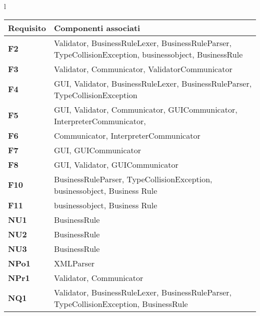 \begin{center}


\large{
\begin{tabular}{l}
\begin{tabular}{||p{3cm}||p{9cm}||} \hline
\textbf{Requisito} & {Componenti associati} \\ \hline
\textbf{F2} & Validator, BusinessRuleLexer, BusinessRuleParser, TypeCollisionException, businessobject, BusinessRule \\ \hline
\textbf{F3} & Validator, Communicator, ValidatorCommunicator \\ \hline
\textbf{F4} & GUI, Validator, BusinessRuleLexer, BusinessRuleParser, TypeCollisionException \\ \hline
\textbf{F5} & GUI, Validator, Communicator, GUICommunicator, InterpreterCommunicator, \\ \hline
\textbf{F6} & Communicator, InterpreterCommunicator \\ \hline
\textbf{F7} & GUI, GUICommunicator \\ \hline
\textbf{F8} & GUI, Validator, GUICommunicator \\ \hline
\textbf{F10} & BusinessRuleParser, TypeCollisionException, businessobject, Business Rule \\ \hline
\textbf{F11} & businessobject, Business Rule \\ \hline
\textbf{NU1} & BusinessRule \\ \hline
\textbf{NU2} & BusinessRule \\ \hline
\textbf{NU3} & BusinessRule \\ \hline
\textbf{NPo1} &  XMLParser \\ \hline
\textbf{NPr1} & Validator, Communicator \\ \hline
\textbf{NQ1} & Validator, BusinessRuleLexer, BusinessRuleParser, TypeCollisionException, BusinessRule \\ \hline
\end{tabular} \\
\end{tabular}
}
\end{center}


